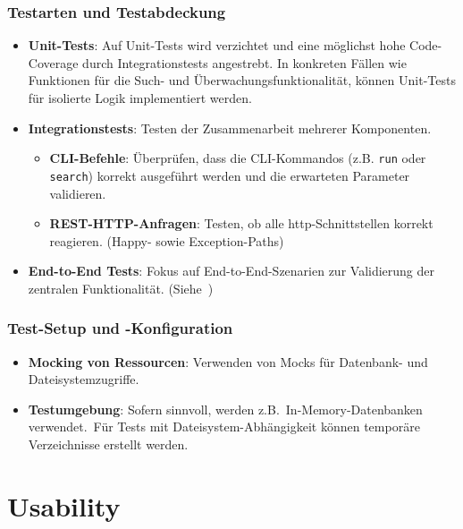 \documentclass[a4paper,12pt]{report}
\begin{document}
    \subsubsection{Testarten und Testabdeckung}
    \begin{itemize}
        \item \textbf{Unit-Tests}: Auf Unit-Tests wird verzichtet und eine möglichst hohe Code-Coverage durch Integrationstests angestrebt.
        In konkreten Fällen wie Funktionen für die Such- und Überwachungsfunktionalität, können Unit-Tests für isolierte Logik implementiert werden.
        \item \textbf{Integrationstests}: Testen der Zusammenarbeit mehrerer Komponenten.
        \begin{itemize}
            \item \textbf{CLI-Befehle}: Überprüfen, dass die CLI-Kommandos (z.B. \texttt{run} oder \texttt{search}) korrekt ausgeführt werden und die erwarteten Parameter validieren.
            \item \textbf{REST-HTTP-Anfragen}: Testen, ob alle \gls{http}-Schnittstellen korrekt reagieren.
            (Happy- sowie Exception-Paths)
        \end{itemize}
        \item \textbf{End-to-End Tests}: Fokus auf End-to-End-Szenarien zur Validierung der zentralen Funktionalität.
        (Siehe~)
    \end{itemize}

    \subsubsection{Test-Setup und -Konfiguration}
    \begin{itemize}
        \item \textbf{Mocking von Ressourcen}: Verwenden von Mocks für Datenbank- und Dateisystemzugriffe.
        \item \textbf{Testumgebung}: Sofern sinnvoll, werden z.B.\ In-Memory-Datenbanken verwendet.\ Für Tests mit Dateisystem-Abhängigkeit können temporäre Verzeichnisse erstellt werden.
    \end{itemize}

    \clearpage


    \section{Usability}\label{sec:usability}
\end{document}
